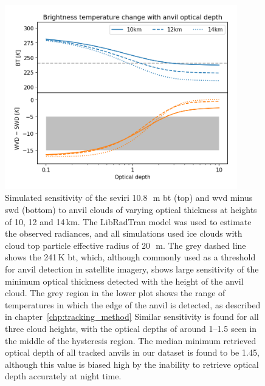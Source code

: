 \begin{figure}[tp]
    \centering
    \includegraphics[width=0.9\textwidth]{figures/chapter4_04.png}
    \caption[
    Simulated sensitivity of the \acrshort{seviri} 10.8\,\unit{\mu m} \acrshort{bt} (top) and \acrshort{wvd} minus \acrshort{swd} (bottom) to anvil clouds of varying optical thickness at heights of 10, 12 and 14\,\unit{km}
    ]{
    Simulated sensitivity of the \acrshort{seviri} 10.8\,\unit{\mu m} \acrshort{bt} (top) and \acrshort{wvd} minus \acrshort{swd} (bottom) to anvil clouds of varying optical thickness at heights of 10, 12 and 14\,\unit{km}. The LibRadTran model was used to estimate the observed radiances, and all simulations used ice clouds with cloud top particle effective radius of 20\,\unit{\mu m}. The grey dashed line shows the 241\,\unit{K} \acrshort{bt}, which, although commonly used as a threshold for anvil detection in satellite imagery, shows large sensitivity of the minimum optical thickness detected with the height of the anvil cloud. The grey region in the lower plot shows the range of temperatures in which the edge of the anvil is detected, as described in chapter~\ref{chp:tracking_method} Similar sensitivity is found for all three cloud heights, with the optical depths of around 1--1.5 seen in the middle of the hysteresis region. The median minimum retrieved optical depth of all tracked anvils in our dataset is found to be 1.45, although this value is biased high by the inability to retrieve optical depth accurately at night time.
    }
    \label{fig:S_anvil_sensitivity}
\end{figure}

